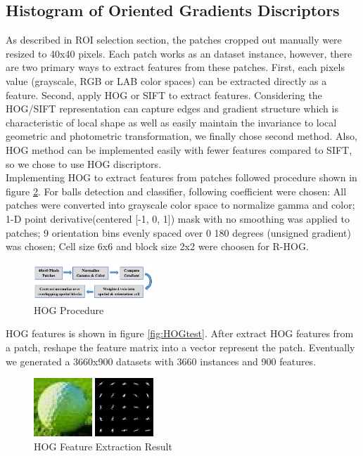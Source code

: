 \documentclass{article}
\begin{document}
\subsection{Histogram of Oriented Gradients Discriptors}
As described in ROI selection section, the patches cropped out manually were resized to 40x40 pixels. Each patch works as an dataset instance, however, there are two primary ways to extract features from these patches. First, each pixels value (grayscale, RGB or LAB color spaces) can be extracted directly as a feature. Second, apply HOG or SIFT to extract features. Considering the HOG/SIFT representation can capture edges and gradient structure which is characteristic of local shape as well as easily maintain the invariance to local geometric and photometric transformation, we finally chose second method. Also, HOG method can be implemented easily with fewer features compared to SIFT, so we chose to use HOG discriptors.\\  

Implementing HOG to extract features from patches followed procedure shown in figure \ref{fig:HOG}. For balls detection and classifier, following coefficient were chosen: All patches were converted into grayscale color space to normalize gamma and color; 1-D point derivative(centered [-1, 0, 1]) mask with no smoothing was applied to patches; 9 orientation bins evenly spaced over 0
180 degrees (unsigned gradient) was chosen; Cell size 6x6 and block size 2x2 were choosen for R-HOG.  
\begin{figure}[htp]
\centering
\includegraphics[width=0.4\textwidth]{HOG.jpg}
\caption{HOG Procedure}
\label{fig:HOG}
\end{figure}

HOG features is shown in figure \ref{fig:HOGtest}. After extract HOG features from a patch, reshape the feature matrix into a vector represent the patch. Eventually we generated a 3660x900 datasets with 3660 instances and 900 features. 

\begin{figure}[htp]
\centering
\includegraphics[width=0.4\textwidth]{hogtest.jpg}
\caption{HOG Feature Extraction Result}
\label{fig:HOG}
\end{figure}
\end{document}

